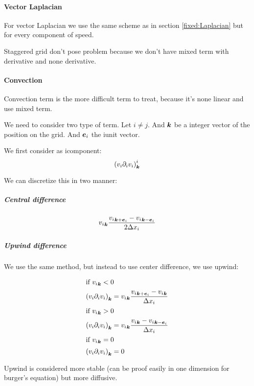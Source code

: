 \paragraph{Vector Laplacian}
\label{fixed:vect:laplacian}
For vector Laplacian we use the same scheme as in section \ref{fixed:Laplacian} but for every component of speed.

Staggered grid don't pose problem because we don't have mixed term with derivative and none derivative.

\paragraph{Convection}

Convection term is the more difficult term to treat, because it's none linear and use mixed term.

We need to consider two type of term. Let $i\neq j$. And ${\boldsymbol {k}}$ be a integer vector of the position on the grid.
And ${\boldsymbol {e}}_i$ the i\th unit vector.

We first consider as i\th component:
\begin{equation}
\left(v_{i}\partial_{i}v_{i}\right)^{i}_{{\boldsymbol {k}}}
\end{equation}

We can discretize this in two manner:

\subparagraph{Central difference}
\begin{equation}
{v_{i}}_{{\boldsymbol {k}}}\frac{{v_{i}}_{{\boldsymbol {k}}+{\boldsymbol {e}}_i}-{v_{i}}_{{\boldsymbol {k}}-{\boldsymbol {e}}_i}}{2\Delta x_{i}}
\end{equation}

\subparagraph{Upwind difference}
\label{fixed:upwind}

We use the same method, but instead to use center difference, we use upwind:

\begin{align}
\intertext{if ${v_{i}}_{{\boldsymbol {k}}}<0$}
\left(v_{i}\partial_{i}v_{i}\right)_{{\boldsymbol {k}}}&={v_{i}}_{{\boldsymbol {k}}}\frac{{v_{i}}_{{\boldsymbol {k}}+{\boldsymbol {e}}_i}-{v_{i}}_{{\boldsymbol {k}}}}{\Delta x_{i}}\\
\intertext{if ${v_{i}}_{{\boldsymbol {k}}}>0$}
\left(v_{i}\partial_{i}v_{i}\right)_{{\boldsymbol {k}}}&={v_{i}}_{{\boldsymbol {k}}}\frac{{v_{i}}_{{\boldsymbol {k}}}-{v_{i}}_{{\boldsymbol {k}}-{\boldsymbol {e}}_i}}{\Delta x_{i}}\\
\intertext{if ${v_{i}}_{{\boldsymbol {k}}}=0$}
\left(v_{i}\partial_{i}v_{i}\right)_{{\boldsymbol {k}}}&=0
\end{align}

Upwind is considered more stable (can be proof easily in one dimension for burger's equation) but more diffusive.

